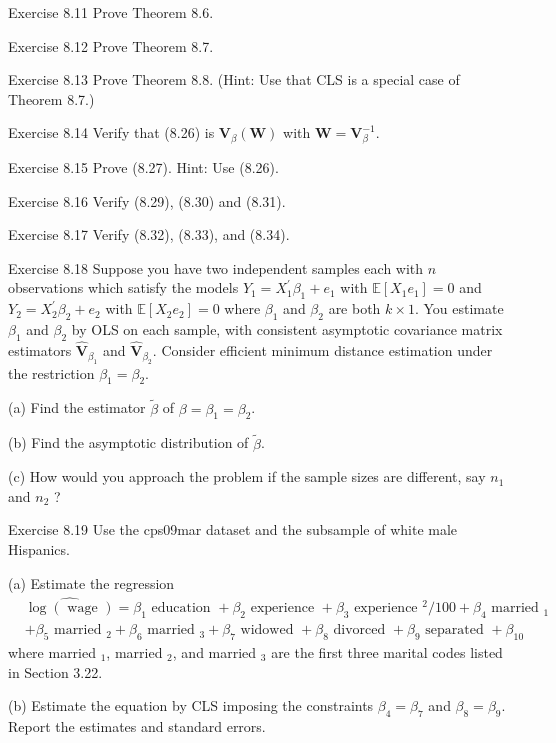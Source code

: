 \documentclass[10pt]{article}
\begin{document}
Exercise 8.11 Prove Theorem 8.6.

Exercise 8.12 Prove Theorem 8.7.

Exercise 8.13 Prove Theorem 8.8. (Hint: Use that CLS is a special case of Theorem 8.7.)

Exercise 8.14 Verify that (8.26) is $\boldsymbol{V}_{\beta}(\boldsymbol{W})$ with $\boldsymbol{W}=\boldsymbol{V}_{\beta}^{-1}$.

Exercise 8.15 Prove (8.27). Hint: Use (8.26).

Exercise 8.16 Verify (8.29), (8.30) and (8.31).

Exercise 8.17 Verify (8.32), (8.33), and (8.34).

Exercise 8.18 Suppose you have two independent samples each with $n$ observations which satisfy the models $Y_{1}=X_{1}^{\prime} \beta_{1}+e_{1}$ with $\mathbb{E}\left[X_{1} e_{1}\right]=0$ and $Y_{2}=X_{2}^{\prime} \beta_{2}+e_{2}$ with $\mathbb{E}\left[X_{2} e_{2}\right]=0$ where $\beta_{1}$ and $\beta_{2}$ are both $k \times 1$. You estimate $\beta_{1}$ and $\beta_{2}$ by OLS on each sample, with consistent asymptotic covariance matrix estimators $\widehat{\boldsymbol{V}}_{\beta_{1}}$ and $\widehat{\boldsymbol{V}}_{\beta_{2}}$. Consider efficient minimum distance estimation under the restriction $\beta_{1}=\beta_{2}$.

(a) Find the estimator $\widetilde{\beta}$ of $\beta=\beta_{1}=\beta_{2}$.

(b) Find the asymptotic distribution of $\widetilde{\beta}$.

(c) How would you approach the problem if the sample sizes are different, say $n_{1}$ and $n_{2}$ ?

Exercise 8.19 Use the cps09mar dataset and the subsample of white male Hispanics.

(a) Estimate the regression
$$
\begin{aligned}
& \widehat{\log (\text { wage })}=\beta_{1} \text { education }+\beta_{2} \text { experience }+\beta_{3} \text { experience }^{2} / 100+\beta_{4} \text { married }_{1} \\
& +\beta_{5} \text { married }_{2}+\beta_{6} \text { married }_{3}+\beta_{7} \text { widowed }+\beta_{8} \text { divorced }+\beta_{9} \text { separated }+\beta_{10}
\end{aligned}
$$
where married $_{1}$, married $_{2}$, and married $_{3}$ are the first three marital codes listed in Section 3.22.

(b) Estimate the equation by CLS imposing the constraints $\beta_{4}=\beta_{7}$ and $\beta_{8}=\beta_{9}$. Report the estimates and standard errors.
\end{document}
